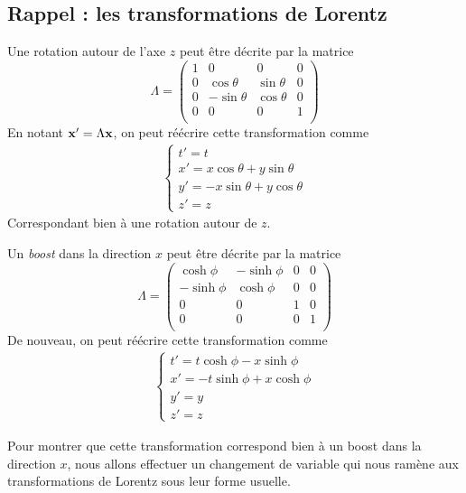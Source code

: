 {\subsection{Rappel : les transformations de Lorentz}

\begin{exmp}
    Une rotation autour de l'axe $z$ peut être décrite par la matrice
    \begin{equation}
        \Lambda = \begin{pmatrix}
1 & 0 & 0 & 0\\
0 & \cos{\theta} & \sin{\theta} & 0\\
0 & -\sin{\theta} & \cos{\theta} & 0\\
0 & 0 & 0 & 1\\
\end{pmatrix}
    \end{equation}
    En notant $\bm{\mathrm{x}}'=\Lambda \bm{\mathrm{x}}$, on peut réécrire cette transformation comme
    \begin{align}
    \left\{
\begin{array}{l}
  t' =t \\
  x' = x\cos{\theta} + y\sin{\theta}\\
  y' = -x\sin{\theta} + y\cos{\theta}\\
  z' = z
\end{array}
\right.
\end{align}
Correspondant bien à une rotation autour de $z$.
\end{exmp}

\begin{exmp}
    Un \textit{boost} dans la direction $x$ peut être décrite par la matrice
    \begin{equation}
        \Lambda = \begin{pmatrix}
\cosh{\phi}& -\sinh{\phi} & 0 & 0\\
-\sinh{\phi} & \cosh{\phi} & 0 & 0\\
0 & 0 & 1 & 0\\
0 & 0 & 0 & 1\\
\end{pmatrix}
    \end{equation}
    De nouveau, on peut réécrire cette transformation comme 
\begin{align}
\label{eq:4.2.1}
    \left\{
\begin{array}{l}
  t' = t\cosh{\phi} - x\sinh{\phi} \\
  x' = -t\sinh{\phi} + x\cosh{\phi}\\
  y' = y\\
  z' = z
\end{array}
\right.
\end{align}
\end{exmp}
Pour montrer que cette transformation correspond bien à un boost dans la direction $x$, nous allons effectuer un changement de variable qui nous ramène aux transformations de Lorentz sous leur forme usuelle.

}
